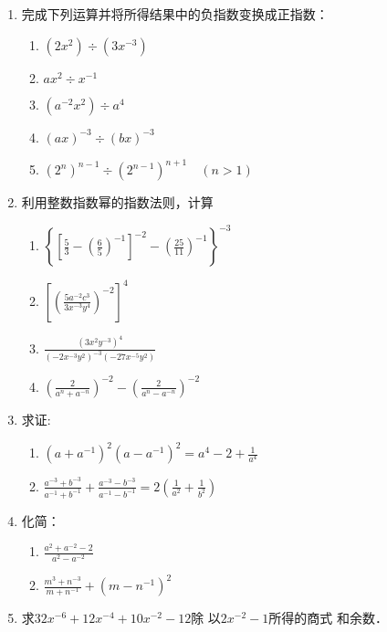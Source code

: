 \begin{enumerate}
\item 完成下列运算并将所得结果中的负指数变换成正指数：
\begin{multicols}{2}
 \begin{enumerate}
    \item $(2x^2)\div (3x^{-3})$
    \item $ax^2\div x^{-1}$
    \item $(a^{-2}x^2)\div a^4$
    \item $(ax)^{-3}\div (bx)^{-3}$
    \item $(2^n)^{n-1} \div (2^{n-1})^{n+1}\quad (n>1)$
\end{enumerate}   
\end{multicols}

\item 利用整数指数幂的指数法则，计算
\begin{multicols}{2}\begin{enumerate}  
\item $\left\{\left[\frac{5}{3}-\left(\frac{6}{5}\right)^{-1}\right]^{-2}-\left(\frac{25}{11}\right)^{-1}\right\}^{-3}$\item $\left[\left(\frac{5 a^{-2} c^{3}}{3 x^{-3} y^{4}}\right)^{-2}\right]^{4}$
\item $\frac{\left(3 x^{2} y^{-3}\right)^4}{\left(-2 x^{-3} y^{2}\right)^{-3}\left(-27 x^{-5} y^{2}\right)}$
\item $\left(\frac{2}{a^{n}+a^{-n}}\right)^{-2}-\left(\frac{2}{a^{n}-a^{-n}}\right)^{-2}$
\end{enumerate}\end{multicols}

\item 求证:
\begin{enumerate}
    \item $\left(a+a^{-1}\right)^{2}\left(a-a^{-1}\right)^{2}=a^{4}-2+\frac{1}{a^{4}}$
    \item $\frac{a^{-3}+b^{-3}}{a^{-1}+b^{-1}}+\frac{a^{-3}-b^{-3}}{a^{-1}-b^{-1}}=2\left(\frac{1}{a^{2}}+\frac{1}{b^{2}}\right)$
\end{enumerate}

\item 化简：
 \begin{multicols}{2}
\begin{enumerate}
    \item  $\frac{a^{2}+a^{-2}-2}{a^{2}-a^{-2}}$
    \item  $\frac{m^{3}+n^{-3}}{m+n^{-1}}+\left(m-n^{-1}\right)^{2}$
\end{enumerate}
\end{multicols}
\item 求$32x^{-6}+12x^{-4}+10x^{-2}-12$除
以$2x^{-2}-1$所得的商式
和余数．
\end{enumerate}

